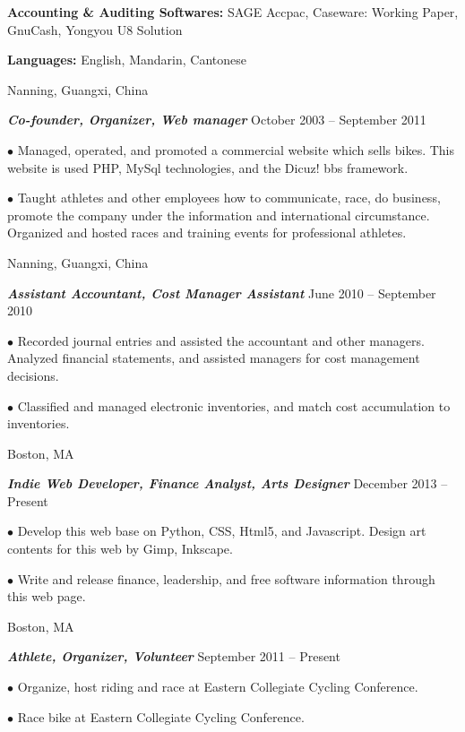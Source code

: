 \documentclass[10pt]{article}
\begin{document}
\noindent
{\bf Accounting \& Auditing Softwares:} SAGE Accpac, Caseware: Working Paper, GnuCash, Yongyou U8 Solution

\noindent
{\bf Languages:} English, Mandarin, Cantonese

\medskip


  \hfill Nanning, Guangxi, China

\noindent \textit{\textbf{Co-founder, Organizer, Web manager}} \hfill October 2003 -- September 2011

\hangindent=0.7cm $\bullet$ Managed, operated, and promoted a commercial website which sells bikes. This website is used PHP, MySql technologies, and the Dicuz! bbs framework.

\hangindent=0.7cm $\bullet$ Taught athletes and other employees how to communicate, race, do business, promote the company under the information and international circumstance. Organized and hosted races and training events for professional athletes.

\medskip

 \hfill Nanning, Guangxi, China

\noindent \textit{\textbf{Assistant Accountant, Cost Manager Assistant}} \hfill June 2010 -- September 2010

\hangindent=0.7cm $\bullet$ Recorded journal entries and assisted the accountant and other managers. Analyzed financial statements, and assisted managers for cost management decisions.

\hangindent=0.7cm $\bullet$ Classified and managed electronic inventories, and match cost accumulation to inventories.

\medskip


 \hfill Boston, MA

\noindent \textit{\textbf{Indie Web Developer, Finance Analyst, Arts Designer}} \hfill December 2013 -- Present

\hangindent=0.7cm $\bullet$ Develop this web base on Python, CSS, Html5, and Javascript. Design art contents for this web by Gimp, Inkscape.

\hangindent=0.7cm $\bullet$ Write and release finance, leadership, and free software information through this web page.

\medskip

 \hfill Boston, MA

\noindent \textit{\textbf{Athlete, Organizer, Volunteer}} \hfill September 2011 -- Present

\hangindent=0.7cm $\bullet$ Organize, host riding and race at Eastern Collegiate Cycling Conference.

\hangindent=0.7cm $\bullet$ Race bike at Eastern Collegiate Cycling Conference.
\end{document}
